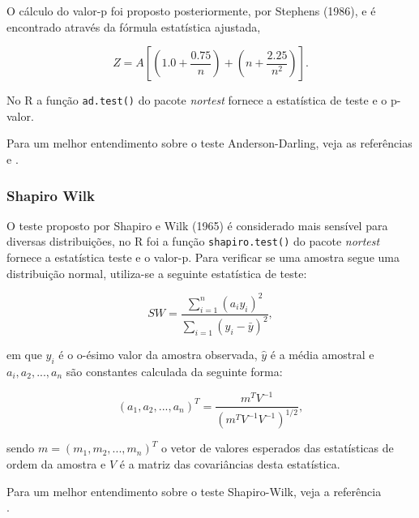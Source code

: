 \documentclass[a4paper,11pt]{article} %
\begin{document}
\vspace{0.5cm}

O cálculo do valor-p foi proposto posteriormente, por Stephens (1986), e é encontrado através da fórmula estatística ajustada,

\begin{equation}
    Z = A \left[ \left(1.0 + \frac{0.75}{n} \right)+  \left(n+\frac{2.25}{n^{2}} \right) \right].
\end{equation}

No R a função \texttt{ad.test()} do pacote \textit{nortest} fornece a estatística de teste e o p-valor.

\vspace{0.5cm}

Para um melhor entendimento sobre o teste Anderson-Darling, veja as referências \\ \cite{anderson1952asymptotic} e \cite{stephens1986edf}.

\subsubsection{Shapiro Wilk}

O teste proposto por Shapiro e Wilk (1965) é considerado mais sensível para diversas distribuições, no R foi a função \texttt{shapiro.test()} do pacote \textit{nortest} fornece a estatística teste e o valor-p. Para verificar se uma amostra segue uma distribuição normal, utiliza-se a seguinte estatística de teste: 

\begin{equation}
    SW = \frac{\sum_{i=1}^{n} (a_{i}y_{i})^{2}}{\sum_{i=1}  (y_{i} - \bar{y})^{2}},
\end{equation}

\noindent em que $y_{i}$ é o o-ésimo valor da amostra observada, $\hat{y}$ é a média amostral e $a_{i},a_{2},...,a_{n}$ são constantes calculada da seguinte forma:

\begin{equation}
    (a_{1},a_{2},...,a_{n})^{T} = \frac{m^{T}V^{-1}}{(m^{T}V^{-1}V^{-1} )^{1/2}},
\end{equation}

\noindent sendo $m=(m_{1},m_{2},...,m_{n})^{T}$ o vetor de valores esperados das estatísticas de ordem da amostra e $V$ é a matriz das covariâncias desta estatística.

\vspace{0.5cm}

Para um melhor entendimento sobre o teste Shapiro-Wilk, veja a referência \\ \cite{shaphiro1965analysis}.
\end{document}
